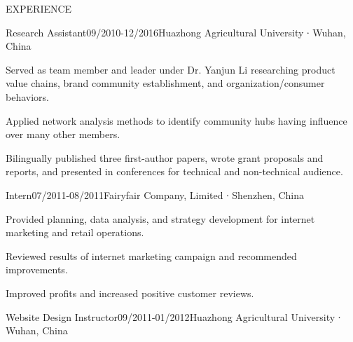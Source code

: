 \documentclass{resume} %
\begin{document}
\begin{rSection}{EXPERIENCE}

\begin{rSubsection}{Research Assistant}{09/2010-12/2016}{Huazhong Agricultural University ∙ Wuhan, China} {}
 \item Served as team member and leader under Dr. Yanjun Li researching product value chains, brand community establishment, and organization/consumer behaviors.  
 \item Applied network analysis methods to identify community hubs having influence over many other members.
 \item Bilingually published three first-author papers, wrote grant proposals and reports, and presented in conferences for technical and non-technical audience.
\end{rSubsection}


\begin{rSubsection}{Intern}{07/2011-08/2011}{Fairyfair Company, Limited ∙ Shenzhen, China} {}
 \item Provided planning, data analysis, and strategy development for internet marketing and retail operations.  
 \item Reviewed results of internet marketing campaign and recommended improvements.
 \item Improved profits and increased positive customer reviews. 
\end{rSubsection}



\begin{rSubsection}{Website Design Instructor}{09/2011-01/2012}{Huazhong Agricultural University ∙ Wuhan, China} {}
\item   
\end{rSubsection}
 
\end{rSection}




 
\end{document}
